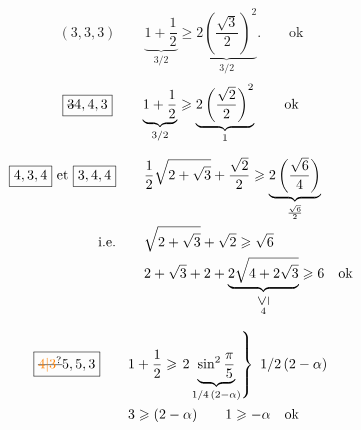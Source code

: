 \[
\boxed{(3,3,3)}\qquad \underbrace{1+\frac12}_{3/2}\geqslant
\underbrace{2\left(\frac{\sqrt3}{2}\right)^2}_{3/2}.\qquad\text{ok}
\]
\[
\boxed{\deleted{3}4,4,3}\qquad\underbrace{1+\frac12}_{3/2}
\geqslant\underbrace{2\left(\frac{\sqrt2}{2}\right)^2}_{1}\qquad\text{ok}
\]

\[
\begin{aligned}
\boxed{4,3,4}\ \text{et}\ \boxed{3,4,4}\qquad&
\frac12\sqrt{2+\sqrt3}+\frac{\sqrt2}{2}
\geqslant\underbrace{2\left(\frac{\sqrt6}{4}\right)}_{\frac{\sqrt6}{2}}\\
\text{i.e.}\qquad&\sqrt{2+\sqrt3}+\sqrt2\geqslant\sqrt6\\
&2+\sqrt3+2+\underbrace{2\sqrt{4+2\sqrt3}}_{\substack{\rotatebox{90}{$\leq$}\\4}}
\geqslant6\quad\text{ok}
\end{aligned}
\]

\[
\begin{aligned}
\boxed{\deleted{\unsure{4|3}}5,5,3}\qquad&
1+\frac12\geqslant\left.2\underbrace{\sin^2\frac\pi5}_{1/4\,(2-\alpha)}
\right\}\ 1/2\,(2-\alpha)\\
&3\geqslant(2-\alpha)\qquad1\geqslant-\alpha\quad\text{ok}
\end{aligned}
\]
